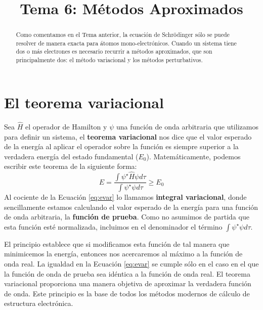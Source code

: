 \documentclass{tufte-handout}
\title[Química Física II: Tema 6 - Métodos Aproximados]{
Tema 6: Métodos Aproximados}
\date{}  %
\begin{document}
\maketitle%

\begin{abstract}
\noindent Como comentamos en el Tema anterior, la ecuación de 
Schrödinger sólo se puede resolver de manera exacta 
para átomos mono-electrónicos. Cuando un sistema tiene 
dos o más electrones es necesario recurrir
a métodos aproximados, que son principalmente dos: el
método variacional y los métodos perturbativos. 

\end{abstract}


\section{El teorema variacional}
Sea $\hat{H}$ el operador de Hamilton y $\psi$ una función 
de onda arbitraria que utilizamos para definir un sistema, 
el \textbf{teorema variacional} nos dice que el valor 
esperado de la energía al aplicar el operador
sobre la función es siempre superior a la verdadera 
energía del estado fundamental ($E_0$). Matemáticamente, 
podemos escribir este teorema de la siguiente forma:
\begin{equation}
    E=\frac{\int{\psi^\star\hat{H}\psi d\tau}}{\int{\psi^\star \psi d\tau}} \geq E_0
    \label{eq:evar}
\end{equation}
Al cociente de la Ecuación \ref{eq:evar} lo llamamos
\textbf{integral variacional}, donde sencillamente estamos 
calculando el valor esperado de la energía para una función de
onda arbitraria, la \textbf{función de prueba}. Como no 
asumimos de partida que esta función esté normalizada,
incluimos en el denominador el término 
${\int{\psi^\star \psi d\tau}}$. 

El principio establece
que si modificamos esta función de tal manera que minimicemos
la energía, entonces nos acercaremos al máximo a la función 
de onda real. La igualdad en la Ecuación \ref{eq:evar} se 
cumple sólo en el caso en el que la función de onda de prueba 
sea idéntica a la función de onda real. El teorema variacional
proporciona una manera objetiva de aproximar la verdadera función
de onda. Este principio es la base de todos los métodos modernos
de  cálculo de estructura electrónica.
\end{document}
